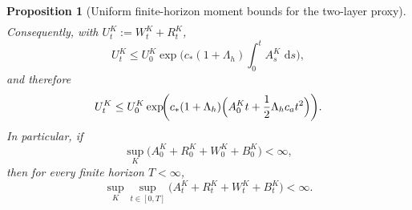 \documentclass{article}
\newtheorem{proposition}[theorem]{Proposition}
\theoremstyle{definition}
\newcommand{\dd}{\,\mathrm{d}}
\begin{document}
\begin{proposition}[Uniform finite-horizon moment bounds for the two-layer proxy]
\begin{align}
  \label{eq:concrete-R-bound}
\end{align}
Consequently, with $U_t^K:=W_t^K+R_t^K$,
\begin{equation}
  U_t^K
  \le
  U_0^K
  \exp\!\biggl(
    c_\ast(1+\Lambda_h)
    \int_0^t A_s^K\,\dd s
  \biggr),
  \label{eq:concrete-U-bound}
\end{equation}
and therefore
\begin{equation}
  U_t^K
  \le
  U_0^K
  \exp\!\biggl(
    c_\ast(1+\Lambda_h)
    \Bigl(
      A_0^K t + \frac12 \Lambda_h c_a t^2
    \Bigr)
  \biggr).
  \label{eq:concrete-U-explicit}
\end{equation}
In particular, if
\[
  \sup_K\bigl(A_0^K+R_0^K+W_0^K+B_0^K\bigr)<\infty,
\]
then for every finite horizon $T<\infty$,
\[
  \sup_K\sup_{t\in[0,T]}
  \bigl(
    A_t^K+R_t^K+W_t^K+B_t^K
  \bigr)
  <\infty.
\]
\end{proposition}
\end{document}
